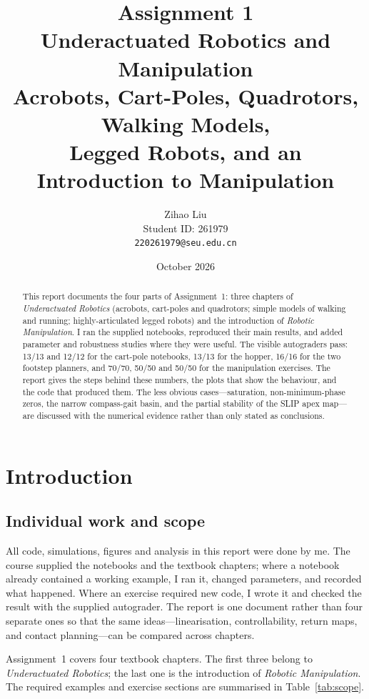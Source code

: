\documentclass[11pt]{report}
\title{\textbf{Assignment 1}\\[6pt]
Underactuated Robotics and Manipulation\\[4pt]
\large Acrobots, Cart-Poles, Quadrotors, Walking Models,\\
Legged Robots, and an Introduction to Manipulation}
\author{Zihao Liu\\[2pt]
Student ID: 261979\\[2pt]
\texttt{220261979@seu.edu.cn}}
\date{October 2026}
\begin{document}
\maketitle

\begin{abstract}
This report documents the four parts of Assignment~1: three chapters of
\emph{Underactuated Robotics} (acrobots, cart-poles and quadrotors; simple
models of walking and running; highly-articulated legged robots) and the
introduction of \emph{Robotic Manipulation}.  I ran the supplied notebooks,
reproduced their main results, and added parameter and robustness studies
where they were useful.  The visible autograders pass: 13/13 and 12/12 for the
cart-pole notebooks, 13/13 for the hopper, 16/16 for the two footstep
planners, and 70/70, 50/50 and 50/50 for the manipulation exercises.  The
report gives the steps behind these numbers, the plots that show the behaviour,
and the code that produced them.  The less obvious cases---saturation,
non-minimum-phase zeros, the narrow compass-gait basin, and the partial
stability of the SLIP apex map---are discussed with the numerical evidence
rather than only stated as conclusions.
\end{abstract}

\tableofcontents
\listoffigures
\listoftables

\chapter{Introduction}

\section{Individual work and scope}

All code, simulations, figures and analysis in this report were done by me.
The course supplied the notebooks and the textbook chapters; where a notebook
already contained a working example, I ran it, changed parameters, and recorded
what happened.  Where an exercise required new code, I wrote it and checked the
result with the supplied autograder.  The report is one document rather than
four separate ones so that the same ideas---linearisation, controllability,
return maps, and contact planning---can be compared across chapters.

Assignment~1 covers four textbook chapters.  The first three belong to
\emph{Underactuated Robotics}; the last one is the introduction of
\emph{Robotic Manipulation}.  The required examples and exercise sections are
summarised in Table~\ref{tab:scope}.
\end{document}
